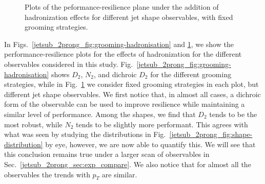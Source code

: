 \documentclass[11pt,letterpaper]{article}
\begin{document}
\begin{figure}
  \caption{Plots of the peformance-resilience plane under the addition of hadronization effects for different jet shape observables, with fixed grooming strategies.}\label{jetsub_2prong_fig:shapes-hadronisation}
\end{figure}


In Figs.~\ref{jetsub_2prong_fig:grooming-hadronisation} and \ref{jetsub_2prong_fig:shapes-hadronisation}, we show the performance-resilience plots for the effects of hadronization for the different observables considered in this study.
%
Fig.~\ref{jetsub_2prong_fig:grooming-hadronisation} shows $D_2$, $N_2$, and dichroic $D_2$ for the different grooming strategies, while in Fig.~\ref{jetsub_2prong_fig:shapes-hadronisation} we consider fixed grooming strategies in each plot, but different jet shape observables.
%
We first notice that, in almost all cases, a dichroic form of the observable can be used to improve resilience while maintaining a similar level of performance.
%
Among the shapes, we find that $D_2$ tends to be the most robust, while $N_2$ tends to be slightly more performant.
%
This agrees with what was seen by studying the distributions in Fig.~\ref{jetsub_2prong_fig:shape-distribution} by eye, however, we are now able to quantify this.
%
We will see that this conclusion remains true under a larger scan of observables in Sec.~\ref{jetsub_2prong_sec:exp_compare}.
%
We also notice that for almost all the observables the trends with $p_T$ are similar.
\end{document}
